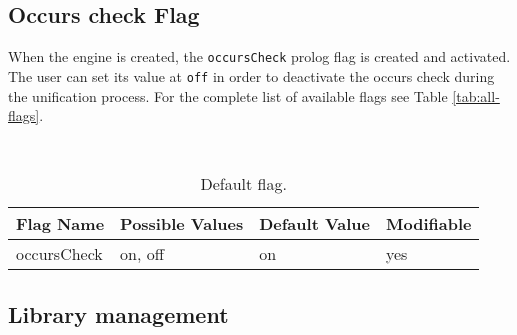 \subsection{Occurs check Flag}

When the engine is created, the \texttt{occursCheck} prolog flag is created and activated. The user can set its value at \texttt{off} in order to deactivate
the occurs check during the unification process. For the complete list of available flags see Table \ref{tab:all-flags}.

\begin{table}[h]
	\begin{center}{\small\tt
			\begin{tabular}{p{4.8cm}|p{2.2cm}|p{2.2cm}|p{1.8cm}}\hline\hline
				Flag Name   & Possible Values & Default Value & Modifiable\\ \hline\hline
				occursCheck          & {on, off}          &  on       & yes\\\hline\hline
			\end{tabular}
		}\end{center}
		\caption{Default flag.}
\end{table}

\subsection{Library management}
\label{ssec:library-management}


